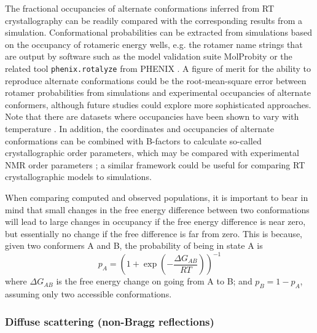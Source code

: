 \documentclass[9pt,review]{livecoms}
\begin{document}
The fractional occupancies of alternate conformations inferred from RT crystallography can be readily compared with the corresponding results from a simulation.
Conformational probabilities can be extracted from simulations based on the occupancy of rotameric energy wells, e.g. the rotamer name strings \cite{lovell_penultimate_2000} that are output by software such as the model validation suite MolProbity \cite{williams_molprobity_2018} or the related tool \verb|phenix.rotalyze| from PHENIX \cite{liebschner_macromolecular_2019}.
A figure of merit for the ability to reproduce alternate conformations could be the root-mean-square error between rotamer probabilities from simulations and experimental occupancies of alternate conformers, although future studies could explore more sophisticated approaches.
Note that there are datasets where occupancies have been shown to vary with temperature \cite{bradford_temperature_2021}.
In addition, the coordinates and occupancies of alternate conformations can be combined with B-factors to calculate so-called crystallographic order parameters, which may be compared with experimental NMR order parameters \cite{fenwick_integrated_2014}; a similar framework could be useful for comparing RT crystallographic models to simulations.

When comparing computed and observed populations, it is important to bear in mind that small changes in the free energy difference between two conformations will lead to large changes in occupancy if the free energy difference is near zero, but essentially no change if the free difference is far from zero.
This is because, given two conformers A and B, the probability of being in state A is
\begin{equation}
\label{eqn:alt_confs}
p_A = \left( 1 + \exp \left(- \frac {\Delta G_{AB}} {R T} \right) \right )^{-1}
\end{equation}
\noindent where $\Delta G_{AB}$ is the free energy change on going from A to B; and $p_B = 1-p_A$, assuming only two accessible conformations.

\subsubsection{Diffuse scattering (non-Bragg reflections)}
\label{sub2:diffuse}
\end{document}
